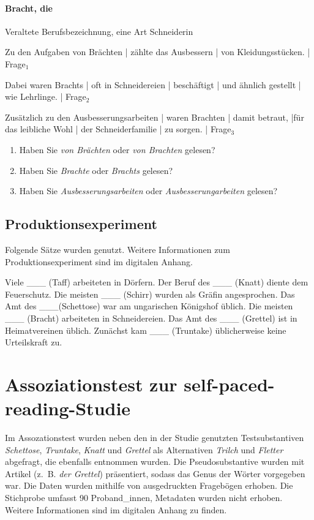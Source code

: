 \subsubsection*{Bracht, die}
Veraltete Berufsbezeichnung, eine Art Schneiderin
\begin{SchmittAppendixList}
\item Zu den Aufgaben von Brächten |  zählte das Ausbessern | von Kleidungsstücken. | Frage$_1$ 
\item Dabei waren Brachts | oft in Schneidereien | beschäftigt | und ähnlich gestellt | wie Lehrlinge. | Frage$_2$ 
\item Zusätzlich zu den Ausbesserungsarbeiten | waren Brachten | damit betraut, |für das leibliche Wohl | der Schneiderfamilie | zu sorgen. | Frage$_3$
\end{SchmittAppendixList}

\begin{enumerate}
\item Haben Sie \textit{von Brächten} oder \textit{von Brachten} gelesen?
\item Haben Sie \textit{Brachte} oder \textit{Brachts} gelesen? 
\item Haben Sie \textit{Ausbesserungsarbeiten} oder \textit{Ausbesserungarbeiten} gelesen?
\end{enumerate}

\largerpage[-2]
\section{Produktionsexperiment}
\label{prodpaced}
Folgende Sätze wurden genutzt. Weitere Informationen zum Produktionsexperiment sind im digitalen Anhang.

\ea Viele \_\_\_ (Taff) arbeiteten in Dörfern. 
\ex Der Beruf des \_\_\_ (Knatt) diente dem Feuerschutz.
\ex Die meisten  \_\_\_ (Schirr) wurden als Gräfin angesprochen.
\ex Das Amt des \_\_\_(Schettose) war am ungarischen Königshof üblich.
\ex Die meisten \_\_\_ (Bracht) arbeiteten in Schneidereien.
\ex Das Amt des \_\_\_ (Grettel) ist in Heimatvereinen üblich.
\ex Zunächst kam \_\_\_ (Truntake) üblicherweise keine Urteilskraft zu.
\z

\chapter{Assoziationstest zur self-paced-reading-Studie}
\label{asso}

Im Assozationstest wurden neben den in der Studie genutzten Testsubstantiven \textit{Schettose}, \textit{Truntake}, \textit{Knatt} und \textit{Grettel} als Alternativen \textit{Trilch} und \textit{Fletter} abgefragt, die ebenfalls \textcite{Kopcke.2000b} entnommen wurden.  Die Pseudosubstantive wurden mit Artikel (z.~B. \textit{der Grettel}) präsentiert, sodass das Genus der Wörter vorgegeben war. Die Daten wurden mithilfe von ausgedruckten Fragebögen erhoben. Die Stichprobe umfasst 90 Proband\_innen, Metadaten wurden nicht erhoben. Weitere Informationen sind im digitalen Anhang zu finden.

